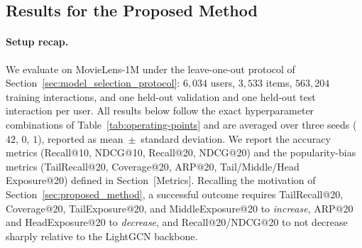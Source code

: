 \begin{table}[t]
\centering
\caption{Exact hyperparameter combination for each configuration reported in
Section~\ref{sec:results} (test-set results, mean over 3 seeds: 42, 0, 1). All configurations use
$d=64$, $K=2$, $\tau=0.2$, and the degree-aware dropout scheme; the main forward pass used for
$\mathcal{L}_{BPR}$ and $\mathcal{L}_{ILE}$ is \emph{not} itself augmented in these results
(aug\_main~$=$~off for every row). Consequently, Degree-Aware Graph Augmentation
(Section~\ref{sec:optional_degree_aware_graph_augmentation}) is validated here only
indirectly, through the view construction of the contrastive branch
(Section~\ref{sec:contrastive_learning}); a standalone ablation of main-pass augmentation is
left for future work.}
\label{tab:operating-points}
\end{table}

\subsection{Results for the Proposed Method}
\label{sec:results}

\paragraph{Setup recap.}
We evaluate on MovieLens-1M under the leave-one-out protocol of
Section~\ref{sec:model_selection_protocol}: $6{,}034$ users, $3{,}533$ items, $563{,}204$
training interactions, and one held-out validation and one held-out test interaction per
user. All results below follow the exact hyperparameter combinations of
Table~\ref{tab:operating-points} and are averaged over three seeds ($42$, $0$, $1$), reported
as mean~$\pm$~standard deviation. We report the accuracy metrics (Recall@10, NDCG@10,
Recall@20, NDCG@20) and the popularity-bias metrics (TailRecall@20, Coverage@20, ARP@20,
Tail/Middle/Head Exposure@20) defined in Section~[Metrics]. Recalling the motivation of
Section~\ref{sec:proposed_method}, a successful outcome requires TailRecall@20,
Coverage@20, TailExposure@20, and MiddleExposure@20 to \emph{increase}, ARP@20 and
HeadExposure@20 to \emph{decrease}, and Recall@20/NDCG@20 to not decrease sharply relative to
the LightGCN backbone.

